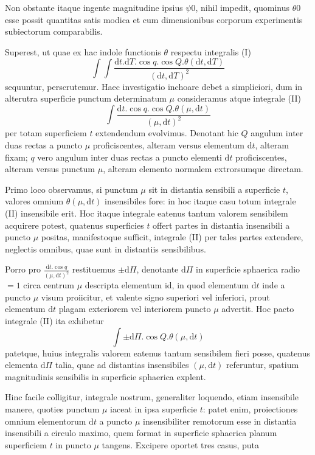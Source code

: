 Non obstante itaque ingente magnitudine ipsius $\psi0$, nihil impedit, quominus $\theta0$ esse possit quantitas satis modica et cum dimensionibus corporum experimentis subiectorum comparabilis.

Superest, ut quae ex hac indole functionis $\theta$ respectu integralis (I)
\[
\int\int\frac{\mathrm{d}t.\mathrm{d}T.\cos q.\cos Q.\theta(\mathrm{d}t,\mathrm{d}T)}{(\mathrm{d}t,\mathrm{d}T)^2}
\]
sequuntur, perscrutemur. Haec investigatio inchoare debet a simpliciori, dum in alterutra superficie punctum determinatum $\mu$ consideramus atque integrale (II)
\[
\int\frac{\mathrm{d}t.\cos q.\cos Q.\theta(\mu,\mathrm{d}t)}{(\mu,\mathrm{d}t)^2}
\]
per totam superficiem $t$ extendendum evolvimus. Denotant hic $Q$ angulum inter duas rectas a puncto $\mu$ proficiscentes, alteram versus elementum $\mathrm{d}t$, alteram fixam; $q$ vero angulum inter duas rectas a puncto elementi $\mathrm{d}t$ proficiscentes, alteram versus punctum $\mu$, alteram elemento normalem extrorsumque directam.

Primo loco observamus, si punctum $\mu$ sit in distantia sensibili a superficie $t$, valores omnium $\theta(\mu,\mathrm{d}t)$ insensibiles fore: in hoc itaque casu totum integrale (II) insensibile erit. Hoc itaque integrale eatenus tantum valorem sensibilem acquirere potest, quatenus superficies $t$ offert partes in distantia insensibili a puncto $\mu$ positas, manifestoque sufficit, integrale (II) per tales partes extendere, neglectis omnibus, quae sunt in distantiis sensibilibus.

Porro pro $\frac{\mathrm{d}t.\cos q}{(\mu,\mathrm{d}t)^2}$ restituemus $\pm\mathrm{d}\Pi$, denotante $\mathrm{d}\Pi$ in superficie sphaerica radio $=1$ circa centrum $\mu$ descripta elementum id, in quod elementum $\mathrm{d}t$ inde a puncto $\mu$ visum proiicitur, et valente signo superiori vel inferiori, prout elementum $\mathrm{d}t$ plagam exteriorem vel interiorem puncto $\mu$ advertit. Hoc pacto integrale (II) ita exhibetur
\[
\int\pm\mathrm{d}\Pi.\cos Q.\theta(\mu,\mathrm{d}t)
\]
patetque, huius integralis valorem eatenus tantum sensibilem fieri posse, quatenus elementa $\mathrm{d}\Pi$ talia, quae ad distantias insensibiles $(\mu,\mathrm{d}t)$ referuntur, spatium magnitudinis sensibilis in superficie sphaerica explent.

Hinc facile colligitur, integrale nostrum, generaliter loquendo, etiam insensibile manere, quoties punctum $\mu$ iaceat in ipsa superficie $t$: patet enim, proiectiones omnium elementorum $\mathrm{d}t$ a puncto $\mu$ insensibiliter remotorum esse in distantia insensibili a circulo maximo, quem format in superficie sphaerica planum superficiem $t$ in puncto $\mu$ tangens. Excipere oportet tres casus, puta

